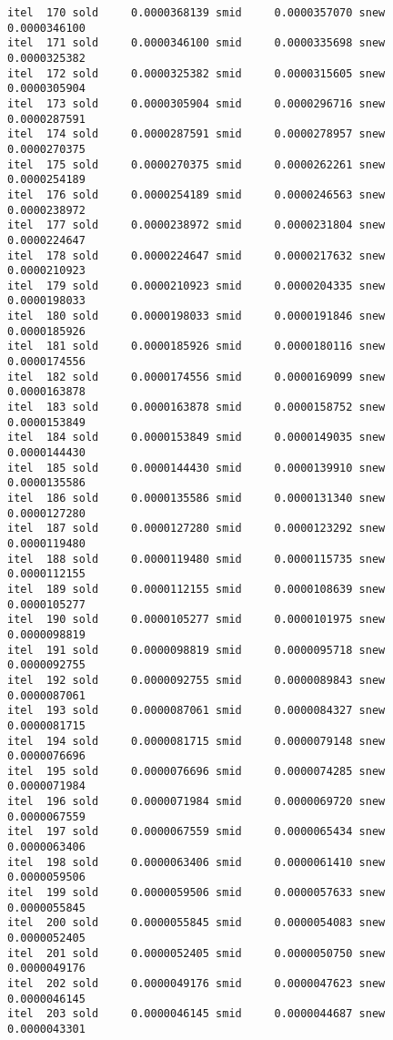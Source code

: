 \documentclass[
  12pt,
  letterpaper,
  DIV=11,
  numbers=noendperiod]{scrartcl}
\begin{document}
\begin{verbatim}
itel  170 sold     0.0000368139 smid     0.0000357070 snew     0.0000346100 
itel  171 sold     0.0000346100 smid     0.0000335698 snew     0.0000325382 
itel  172 sold     0.0000325382 smid     0.0000315605 snew     0.0000305904 
itel  173 sold     0.0000305904 smid     0.0000296716 snew     0.0000287591 
itel  174 sold     0.0000287591 smid     0.0000278957 snew     0.0000270375 
itel  175 sold     0.0000270375 smid     0.0000262261 snew     0.0000254189 
itel  176 sold     0.0000254189 smid     0.0000246563 snew     0.0000238972 
itel  177 sold     0.0000238972 smid     0.0000231804 snew     0.0000224647 
itel  178 sold     0.0000224647 smid     0.0000217632 snew     0.0000210923 
itel  179 sold     0.0000210923 smid     0.0000204335 snew     0.0000198033 
itel  180 sold     0.0000198033 smid     0.0000191846 snew     0.0000185926 
itel  181 sold     0.0000185926 smid     0.0000180116 snew     0.0000174556 
itel  182 sold     0.0000174556 smid     0.0000169099 snew     0.0000163878 
itel  183 sold     0.0000163878 smid     0.0000158752 snew     0.0000153849 
itel  184 sold     0.0000153849 smid     0.0000149035 snew     0.0000144430 
itel  185 sold     0.0000144430 smid     0.0000139910 snew     0.0000135586 
itel  186 sold     0.0000135586 smid     0.0000131340 snew     0.0000127280 
itel  187 sold     0.0000127280 smid     0.0000123292 snew     0.0000119480 
itel  188 sold     0.0000119480 smid     0.0000115735 snew     0.0000112155 
itel  189 sold     0.0000112155 smid     0.0000108639 snew     0.0000105277 
itel  190 sold     0.0000105277 smid     0.0000101975 snew     0.0000098819 
itel  191 sold     0.0000098819 smid     0.0000095718 snew     0.0000092755 
itel  192 sold     0.0000092755 smid     0.0000089843 snew     0.0000087061 
itel  193 sold     0.0000087061 smid     0.0000084327 snew     0.0000081715 
itel  194 sold     0.0000081715 smid     0.0000079148 snew     0.0000076696 
itel  195 sold     0.0000076696 smid     0.0000074285 snew     0.0000071984 
itel  196 sold     0.0000071984 smid     0.0000069720 snew     0.0000067559 
itel  197 sold     0.0000067559 smid     0.0000065434 snew     0.0000063406 
itel  198 sold     0.0000063406 smid     0.0000061410 snew     0.0000059506 
itel  199 sold     0.0000059506 smid     0.0000057633 snew     0.0000055845 
itel  200 sold     0.0000055845 smid     0.0000054083 snew     0.0000052405 
itel  201 sold     0.0000052405 smid     0.0000050750 snew     0.0000049176 
itel  202 sold     0.0000049176 smid     0.0000047623 snew     0.0000046145 
itel  203 sold     0.0000046145 smid     0.0000044687 snew     0.0000043301 

\end{verbatim}
\end{document}
